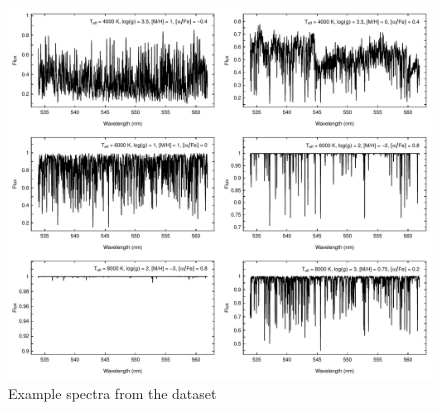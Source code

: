 \documentclass[a4paper,fleqn,usenatbib]{mnras}
\begin{document}
\begin{figure}
\centering\includegraphics[width=\textwidth]{espectros.pdf}
\caption{Example spectra from the dataset}
\label{fig:ejemplosEspectros}
\end{figure}

%
\end{document}
